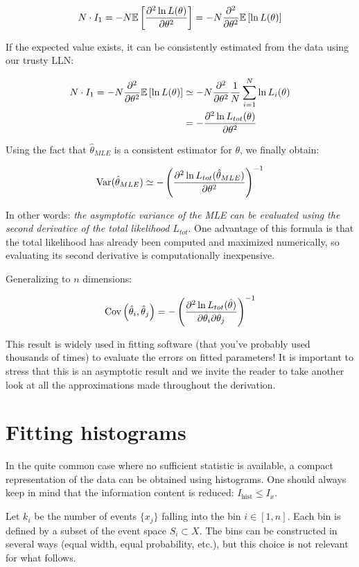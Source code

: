 	\[
		N \cdot I_1= -N\mathbb{E}\left[\frac{\partial^2\ln L(\theta)}{\partial\theta^2}\right]=-N\frac{\partial^2}{\partial\theta^2}\mathbb{E}\left[\ln L(\theta)\right]
	\]
	
If the expected value exists, it can be consistently estimated from the data using our trusty LLN:

\begin{align*}
	N \cdot I_1=-N\frac{\partial^2}{\partial\theta^2}\mathbb{E}\left[\ln L(\theta)\right]	&\simeq -N \frac{\partial^2}{\partial\theta^2} \frac{1}{N}\sum_{i=1}^N\ln L_i(\theta) \\
	&= -\frac{\partial^2\ln L_{tot}(\theta)}{\partial\theta^2}
\end{align*}

	Using the fact that $\hat\theta_{MLE}$ is a consistent estimator for $\theta$, we finally obtain:
	
	\[
		 \operatorname{Var}(\hat\theta_{MLE})\simeq-\left(\frac{\partial^2\ln L_{tot}(\hat\theta_{MLE})}{\partial\theta^2}\right)^{-1}
	\]
	
In other words: \emph{the asymptotic variance of the MLE can be evaluated using the second derivative of the total likelihood $L_{tot}$}. 
One advantage of this formula is that the total likelihood has already been computed and maximized numerically, so evaluating its second derivative is computationally inexpensive.

Generalizing to $n$ dimensions:

	\[
		\operatorname{Cov}\left(\hat{\theta}_i,\hat{\theta}_j\right)=-\left(\frac{\partial^2\ln L_{tot}(\hat{\theta})}{\partial\theta_i\partial\theta_j}\right)^{-1}
	\]
	
This result is widely used in fitting software (that you've probably used thousands of times) to evaluate the errors on fitted parameters!
It is important to stress that this is an asymptotic result and we invite the reader to take another look at all the approximations made throughout the derivation.

\section{Fitting histograms}
\label{sec:fitting_hist}

In the quite common case where no sufficient statistic is available, a compact representation of the data can be obtained using histograms. One should always keep in mind that the information content is reduced: $I_{\text{hist}} \leq I_x$.

Let $k_i$ be the number of events $\{x_j\}$ falling into the bin $i \in [1,n]$. Each bin is defined by a subset of the event space $S_i \subset X$. The bins can be constructed in several ways (equal width, equal probability, etc.), but this choice is not relevant for what follows.

